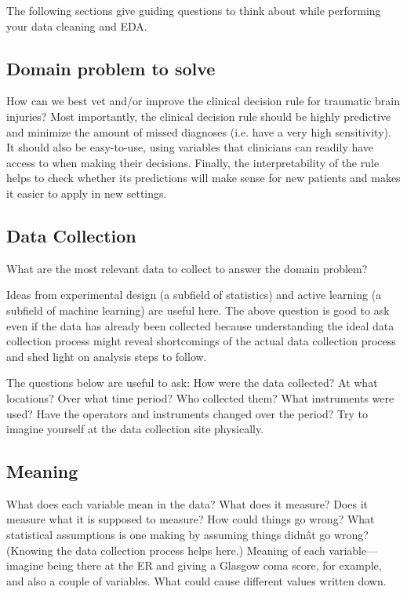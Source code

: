 \documentclass[10pt,letterpaper]{article}
\begin{document}
The following sections give guiding questions to think about while performing your data cleaning and EDA.

\subsection*{Domain problem to solve}

How can we best vet and/or improve the clinical decision rule for traumatic brain injuries? Most importantly, the clinical decision rule should be highly predictive and minimize the amount of missed diagnoses (i.e. have a very high sensitivity). It should also be easy-to-use, using variables that clinicians can readily have access to when making their decisions. Finally, the interpretability of the rule helps to check whether its predictions will make sense for new patients and makes it easier to apply in new settings.

\subsection*{Data Collection}

What are the most relevant data to collect to answer the domain problem?

Ideas from experimental design (a subfield of statistics) and active learning (a subfield of machine learning) are useful here. The above question is good to ask even if the data has already been collected because understanding the ideal data collection process might reveal shortcomings of the actual data collection process and shed light on analysis steps to follow.

The questions below are useful to ask: How were the data collected? At what locations? Over what time period? Who collected them? What instruments were used? Have the operators and instruments changed over the period? Try to imagine yourself at the data collection site physically.

\subsection*{Meaning}

What does each variable mean in the data? What does it measure? Does it measure what it is supposed to measure? How could things go wrong? What statistical assumptions is one making by assuming things didnât go wrong? (Knowing the data collection process helps here.) Meaning of each variable---imagine being there at the ER and giving a Glasgow coma score, for example, and also a couple of variables. What could cause different values written down.
\end{document}
